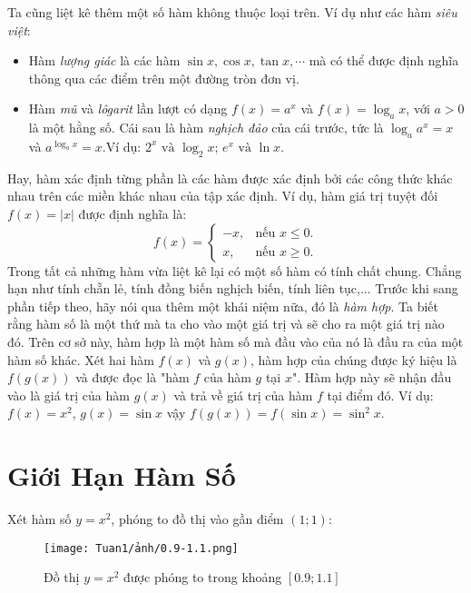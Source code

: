 Ta cũng liệt kê thêm một số hàm không thuộc loại trên.\newline
Ví dụ như các hàm \emph{siêu việt}:\begin{itemize}
    \item Hàm \emph{lượng giác} là các hàm $\sin x,\cos x, \tan x, \cdots$ mà có thể được định nghĩa thông qua các điểm trên một đường tròn đơn vị.
    \item Hàm \emph{mũ} và \emph{lôgarit} lần lượt có dạng $f(x) = a^x$ và $f(x) = \log_a x$, với $a > 0$ là một hằng số. Cái sau là hàm \emph{nghịch đảo} của cái trước, tức là $\log_a a^x = x$ và $a^{\log_a x} = x$.\newline Ví dụ: $2^x \text{ và } \log_2 x$; $e^x \text{ và } \ln x$.
\end{itemize}
Hay, hàm xác định từng phần là các hàm được xác định bởi các công thức khác nhau trên các miền khác nhau của tập xác định.\newline
Ví dụ, hàm giá trị tuyệt đối $f(x) = |x|$ được định nghĩa là:\[
f(x) = 
\begin{cases}
 - x, & \text{nếu } x \leq 0. \\
x, & \text{nếu } x \geq 0.
\end{cases}
\]
Trong tất cả những hàm vừa liệt kê lại có một số hàm có tính chất chung. Chẳng hạn như tính chẵn lẻ, tính đồng biến nghịch biến, tính liên tục,...\newline
Trước khi sang phần tiếp theo, hãy nói qua thêm một khái niệm nữa, đó là \emph{hàm hợp}. Ta biết rằng hàm số là một thứ mà ta cho vào một giá trị và sẽ cho ra một giá trị nào đó. Trên cơ sở này, hàm hợp là một hàm số mà đầu vào của nó là đầu ra của một hàm số khác.\newline
Xét hai hàm $f(x)$ và $g(x)$, hàm hợp của chúng được ký hiệu là $f(g(x))$ và được đọc là "hàm $f$ của hàm $g$ tại $x$". Hàm hợp này sẽ nhận đầu vào là giá trị của hàm $g(x)$ và trả về giá trị của hàm $f$ tại điểm đó.\newline    
Ví dụ: $f(x)=x^2$, $g(x)=\sin x$ vậy $f(g(x))=f(\sin x)=\sin^2 x$.
\section{Giới Hạn Hàm Số}
Xét hàm số $y=x^2$, phóng to đồ thị vào gần điểm $(1;1)$:
\begin{figure}[h!]
    \centering
    \texttt{[image: Tuan1/ảnh/0.9-1.1.png]}
    \caption{Đồ thị \(y=x^2\) được phóng to trong khoảng $[0.9;1.1]$}
    \label{anh3}
\end{figure}

